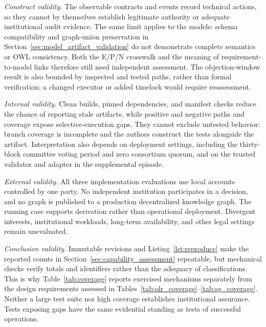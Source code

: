 \documentclass[journal]{IEEEtran}
\begin{document}
\emph{Construct validity.} The observable contracts and events record
technical actions, so they cannot by themselves establish legitimate
authority or adequate institutional audit evidence. The same limit applies
to the models: schema compatibility and graph-union preservation in
Section~\ref{sec:model_artifact_validation} do not demonstrate complete
semantics or OWL consistency. Both the E/P/N crosswalk and the meaning
of requirement-to-model links therefore still need independent assessment.
The objection-window result is also bounded by inspected and tested paths,
rather than formal verification; a changed executor or added timelock
would require reassessment.

\emph{Internal validity.} Clean builds, pinned dependencies, and manifest
checks reduce the chance of reporting stale artifacts, while positive and
negative paths and coverage expose selective-execution gaps. They cannot
exclude untested behavior: branch coverage is incomplete and the authors
construct the tests alongside the artifact. Interpretation also depends
on deployment settings, including the thirty-block committee voting period
and zero consortium quorum, and on the trusted validator and adapter in
the supplemental episode.

\emph{External validity.} All three implementation evaluations use local accounts controlled by one party. No independent institution participates in a decision, and no graph is published to a production decentralized knowledge graph. The running case supports derivation rather than operational deployment. Divergent interests, institutional workloads, long-term availability, and other legal settings remain unevaluated.

\emph{Conclusion validity.} Immutable revisions and
Listing~\ref{lst:reproduce} make the reported counts in
Section~\ref{sec:capability_assessment} repeatable, but mechanical checks
verify totals and identifiers rather than the adequacy of classifications.
This is why Table~\ref{tab:coverage} reports exercised mechanisms separately
from the design requirements assessed in
Tables~\ref{tab:olr_coverage}--\ref{tab:sg_coverage}. Neither a large test
suite nor high coverage establishes institutional assurance. Tests exposing
gaps have the same evidential standing as tests of successful operations.
\end{document}
